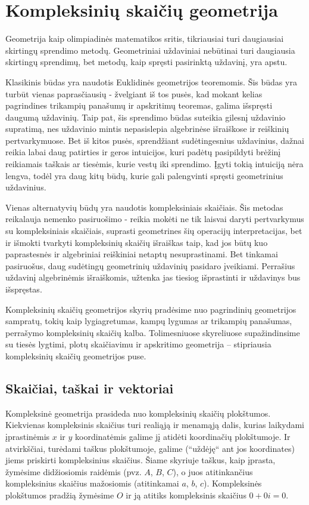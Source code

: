 \documentclass[11pt,a4paper,twoside]{book}
\begin{document}
\chapter {Kompleksinių skaičių geometrija}

Geometrija kaip olimpiadinės matematikos sritis, tikriausiai turi daugiausiai skirtingų sprendimo metodų. Geometriniai uždaviniai nebūtinai turi daugiausia skirtingų sprendimų, bet metodų, kaip spręsti pasirinktą uždavinį, yra apstu. 

Klasikinis būdas yra naudotis Euklidinės geometrijos teoremomis. Šis būdas yra turbūt vienas paprasčiausių - žvelgiant iš tos pusės, kad mokant kelias pagrindines trikampių panašumų ir apskritimų teoremas, galima išspręsti daugumą uždavinių. Taip pat, šis sprendimo būdas suteikia gilesnį uždavinio supratimą, nes uždavinio mintis nepasislepia algebrinėse išraiškose ir reiškinių pertvarkymuose. Bet iš kitos pusės, sprendžiant sudėtingesnius uždavinius, dažnai reikia labai daug patirties ir geros intuicijos, kuri padėtų pasipildyti brėžinį reikiamais taškais ar tiesėmis, kurie vestų iki sprendimo. Įgyti tokią intuiciją nėra lengva, todėl yra daug kitų būdų, kurie gali palengvinti spręsti geometrinius uždavinius.

Vienas alternatyvių būdų yra naudotis kompleksiniais skaičiais. Šis metodas reikalauja nemenko pasiruošimo - reikia mokėti ne tik laisvai daryti pertvarkymus su kompleksiniais skaičiais, suprasti geometrines šių operacijų interpretacijas, bet ir išmokti tvarkyti kompleksinių skaičių išraiškas taip, kad jos būtų kuo paprastesnės ir algebriniai reiškiniai netaptų nesuprastinami. Bet tinkamai pasiruošus, daug sudėtingų geometrinių uždavinių pasidaro įveikiami. Perrašius uždavinį algebrinėmis išraiškomis, užtenka jas tiesiog išprastinti ir uždavinys bus išspręstas. 

Kompleksinių skaičių geometrijos skyrių pradėsime nuo pagrindinių geometrijos
sampratų, tokių kaip lygiagretumas, kampų lygumas ar trikampių panašumas,
perrašymo kompleksinių skaičių kalba. Tolimesniuose skyreliuose supažindinsime
su tiesės lygtimi, plotų skaičiavimu ir apskritimo geometrija -- stipriausia
kompleksinių skaičių geometrijos puse.

\section{Skaičiai, taškai ir vektoriai}

Kompleksinė geometrija prasideda nuo kompleksinių skaičių plokštumos. Kiekvienas
kompleksinis skaičius turi realiąją ir menamąją dalis, kurias laikydami
įprastinėmis $x$ ir $y$ koordinatėmis galime jį atidėti koordinačių plokštumoje.
Ir atvirkščiai, turėdami taškus plokštumoje, galime (“uždėję“ ant jos
koordinates) jiems priskirti kompleksinius skaičius. Šiame skyriuje taškus, kaip
įprasta, žymėsime didžiosiomis raidėmis (pvz. $A$, $B$, $C$), o juos
atitinkančius kompleksinius skaičius mažosiomis (atitinkamai $a$, $b$, $c$).
Kompleksinės plokštumos pradžią žymėsime $O$ ir ją atitiks kompleksinis skaičius
$0 + 0i = 0$.
\end{document}
